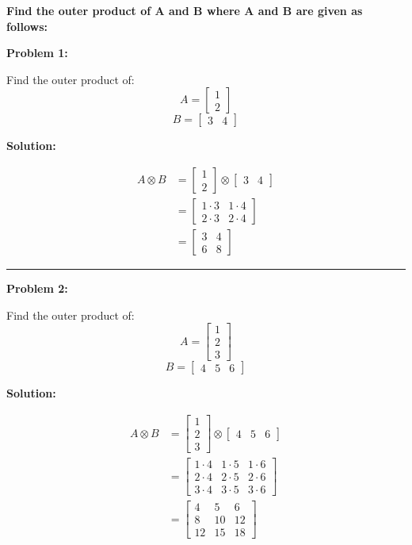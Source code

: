 \documentclass[
  letterpaper,
  DIV=11,
  numbers=noendperiod]{scrreprt}
\theoremstyle{plain}
\theoremstyle{definition}
\theoremstyle{remark}
\begin{document}
\textbf{Find the outer product of A and B where A and B are given as
follows:}

\textbf{Problem 1:}

Find the outer product of: \[A=\begin{bmatrix}1\\2\end{bmatrix}\]
\[B=\begin{bmatrix}3&4\end{bmatrix}\]

\textbf{Solution:}

\begin{align*}
A \otimes B &= \begin{bmatrix}1\\2\end{bmatrix} \otimes \begin{bmatrix}3&4\end{bmatrix} \\
&= \begin{bmatrix}
1 \cdot 3 & 1 \cdot 4 \\
2 \cdot 3 & 2 \cdot 4
\end{bmatrix} \\
&= \begin{bmatrix}
3 & 4 \\
6 & 8
\end{bmatrix}
\end{align*}

\begin{center}\rule{0.5\linewidth}{0.5pt}\end{center}

\textbf{Problem 2:}

Find the outer product of: \[A=\begin{bmatrix}1\\2\\3\end{bmatrix}\]
\[B=\begin{bmatrix}4&5&6\end{bmatrix}\]

\textbf{Solution:}

\begin{align*}
A \otimes B &= \begin{bmatrix}1\\2\\3\end{bmatrix} \otimes \begin{bmatrix}4&5&6\end{bmatrix} \\
&= \begin{bmatrix}
1 \cdot 4 & 1 \cdot 5 & 1 \cdot 6 \\
2 \cdot 4 & 2 \cdot 5 & 2 \cdot 6 \\
3 \cdot 4 & 3 \cdot 5 & 3 \cdot 6
\end{bmatrix} \\
&= \begin{bmatrix}
4 & 5 & 6 \\
8 & 10 & 12 \\
12 & 15 & 18
\end{bmatrix}
\end{align*}
\end{document}
